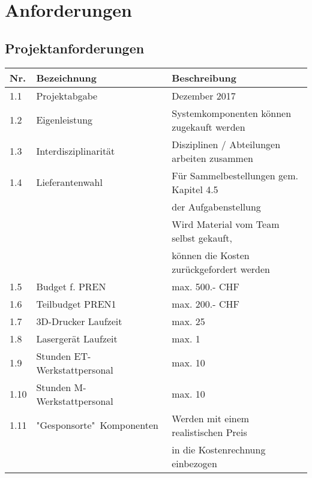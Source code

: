 \documentclass[a4paper]{report}
\begin{document}
\chapter{Anforderungen}
\section{Projektanforderungen}
\begin{tabular}{|l|l|l|}
	\hline 
	\textbf{Nr.} & \textbf{Bezeichnung} & \textbf{Beschreibung} \\ 
	\hline 
	1.1 & Projektabgabe & Dezember 2017 \\ 
	\hline 
	1.2 & Eigenleistung & Systemkomponenten können zugekauft werden \\ 
	\hline
	1.3 & Interdisziplinarität & Disziplinen / Abteilungen arbeiten zusammen \\
	\hline
	1.4 & Lieferantenwahl & Für Sammelbestellungen gem. Kapitel 4.5 \\
	& & der Aufgabenstellung \\
	& & Wird Material vom Team selbst gekauft,\\
	& & können die Kosten zurückgefordert werden \\ 
	\hline 
	1.5 & Budget f. PREN & max. 500.- CHF \\ 
	\hline 
	1.6 & Teilbudget PREN1 & max. 200.- CHF \\ 
	\hline 
	1.7 & 3D-Drucker Laufzeit & max. 25 \\ 
	\hline 
	1.8 & Lasergerät Laufzeit & max. 1 \\ 
	\hline 
	1.9 & Stunden ET-Werkstattpersonal & max. 10 \\ 
	\hline 
	1.10 & Stunden M-Werkstattpersonal & max. 10 \\ 
	\hline 
	1.11 & "Gesponsorte"\ Komponenten & Werden mit einem realistischen Preis\\
	& & in die Kostenrechnung einbezogen \\
	\hline
\end{tabular} 
\end{document}
